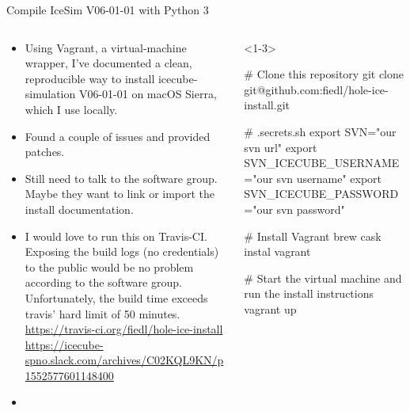 \begin{frame}[fragile]{\done Compile IceSim V06-01-01 with Python 3}
  \begin{columns}
    \begin{column}{0.5\textwidth}
      \begin{itemize}
        \item<1->[\done] Using Vagrant, a virtual-machine wrapper, I've documented a clean, reproducible way to install icecube-simulation V06-01-01 on macOS Sierra, which I use locally.
        \item<2->[\done] Found a couple of issues and provided patches.
        \item<3->[\tobedone] Still need to talk to the software group. Maybe they want to link or import the install  documentation.
        \item<4->[\tobedone] I would love to run this on Travis-CI. Exposing the build logs (no credentials) to the public would be no problem according to the software group. Unfortunately, the build time exceeds travis' hard limit of 50 minutes.\\
          \tiny \url{https://travis-ci.org/fiedl/hole-ice-install} \\
          \url{https://icecube-spno.slack.com/archives/C02KQL9KN/p1552577601148400}
        \item<5-> \color{blue}{Does anyone know about icecube's build bots? Where are the build scripts? Why didn't they indicate that V06-01-01 does not compile on macOS Sierra?}
      \end{itemize}
    \end{column}
    \begin{column}{0.5\textwidth}
      \begin{onlyenv}<1-3>
        \begin{bash}
          # Clone this repository
          git clone git@github.com:fiedl/hole-ice-install.git

          # .secrets.sh
          export SVN="our svn url"
          export SVN_ICECUBE_USERNAME="our svn username"
          export SVN_ICECUBE_PASSWORD="our svn password"

          # Install Vagrant
          brew cask instal vagrant

          # Start the virtual machine and run the install instructions
          vagrant up
        \end{bash}


\end{onlyenv}
\end{column}
\end{columns}
\end{frame}
